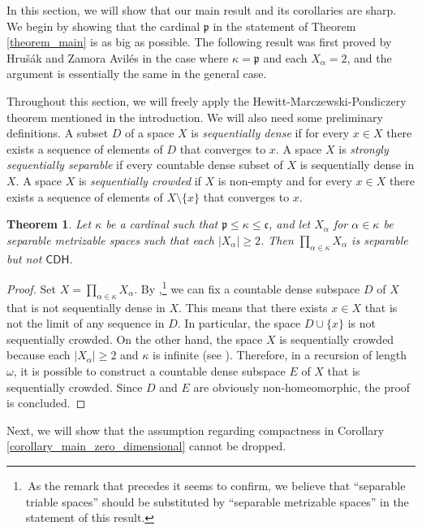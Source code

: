 \documentclass{amsart}
\theoremstyle{plain}
\newtheorem{theorem}{Theorem}[section]
\theoremstyle{definition}
\newcommand{\CDH}{\mathsf{CDH}}
\newcommand{\cccc}{\mathfrak{c}}
\newcommand{\pppp}{\mathfrak{p}}
\begin{document}
In this section, we will show that our main result and its corollaries are sharp. We begin by showing that the cardinal $\pppp$ in the statement of Theorem \ref{theorem_main} is as big as possible. The following result was first proved by Hru\v{s}\'{a}k and Zamora Avil\'{e}s \cite[Theorem 3.3]{hrusak_zamora_aviles} in the case where $\kappa=\pppp$ and each $X_\alpha=2$, and the argument is essentially the same in the general case.

Throughout this section, we will freely apply the Hewitt-Marczewski-Pondiczery theorem mentioned in the introduction. We will also need some preliminary definitions. A subset $D$ of a space $X$ is \emph{sequentially dense} if for every $x\in X$ there exists a sequence of elements of $D$ that converges to $x$. A space $X$ is \emph{strongly sequentially separable} if every countable dense subset of $X$ is sequentially dense in $X$. A space $X$ is \emph{sequentially crowded} if $X$ is non-empty and for every $x\in X$ there exists a sequence of elements of $X\setminus\{x\}$ that converges to $x$.

\begin{theorem}\label{theorem_optimality_p}
Let $\kappa$ be a cardinal such that $\pppp\leq\kappa\leq\cccc$, and let $X_\alpha$ for $\alpha\in\kappa$ be separable metrizable spaces such that each $|X_\alpha|\geq 2$. Then $\prod_{\alpha\in\kappa}X_\alpha$ is separable but not $\CDH$.
\end{theorem}
\begin{proof}
Set $X=\prod_{\alpha\in\kappa}X_\alpha$. By \cite[Theorem 11]{gartside_lo_marsh},\footnote{\,As the remark that precedes it seems to confirm, we believe that ``separable triable spaces'' should be substituted by ``separable metrizable spaces'' in the statement of this result.} we can fix a countable dense subspace $D$ of $X$ that is not sequentially dense in $X$. This means that there exists $x\in X$ that is not the limit of any sequence in $D$. In particular, the space $D\cup\{x\}$ is not sequentially crowded. On the other hand, the space $X$ is sequentially crowded because each $|X_\alpha|\geq 2$ and $\kappa$ is infinite (see \cite[Lemma 4.3]{dobrowolski_krupski_marciszewski}). Therefore, in a recursion of length $\omega$, it is possible to construct a countable dense subspace $E$ of $X$ that is sequentially crowded. Since $D$ and $E$ are obviously non-homeomorphic, the proof is concluded.
\end{proof}

Next, we will show that the assumption regarding compactness in Corollary \ref{corollary_main_zero_dimensional} cannot be dropped.
\end{document}

